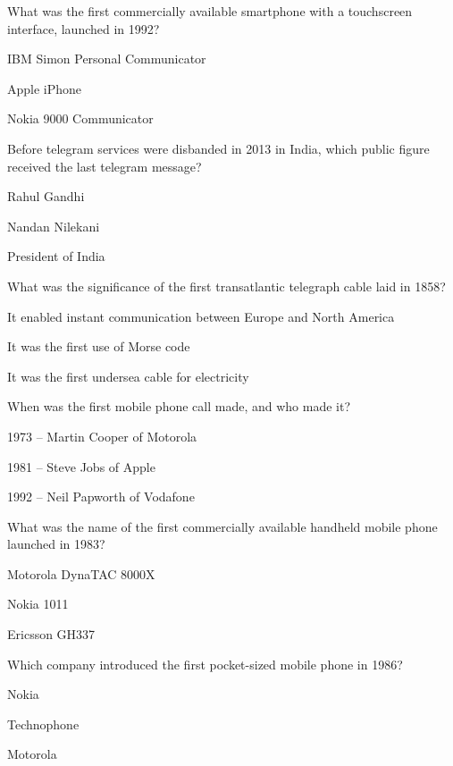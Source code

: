 
\begin{enhancedmcq}{What was the first commercially available smartphone with a touchscreen interface, launched in 1992?}
\item IBM Simon Personal Communicator
\item Apple iPhone
\item Nokia 9000 Communicator

\end{enhancedmcq}
\begin{enhancedmcq}{Before telegram services were disbanded in 2013 in India, which public figure received the last telegram message?}
\item Rahul Gandhi
\item Nandan Nilekani
\item President of India

\end{enhancedmcq}
\begin{enhancedmcq}{What was the significance of the first transatlantic telegraph cable laid in 1858?}
\item It enabled instant communication between Europe and North America
\item It was the first use of Morse code
\item It was the first undersea cable for electricity

\end{enhancedmcq}
\begin{enhancedmcq}{When was the first mobile phone call made, and who made it?}
\item 1973 – Martin Cooper of Motorola
\item 1981 – Steve Jobs of Apple
\item 1992 – Neil Papworth of Vodafone

\end{enhancedmcq}
\begin{enhancedmcq}{What was the name of the first commercially available handheld mobile phone launched in 1983?}
\item Motorola DynaTAC 8000X
\item Nokia 1011
\item Ericsson GH337

\end{enhancedmcq}
\begin{enhancedmcq}{Which company introduced the first pocket-sized mobile phone in 1986?}
\item Nokia
\item Technophone
\item Motorola

\end{enhancedmcq}
